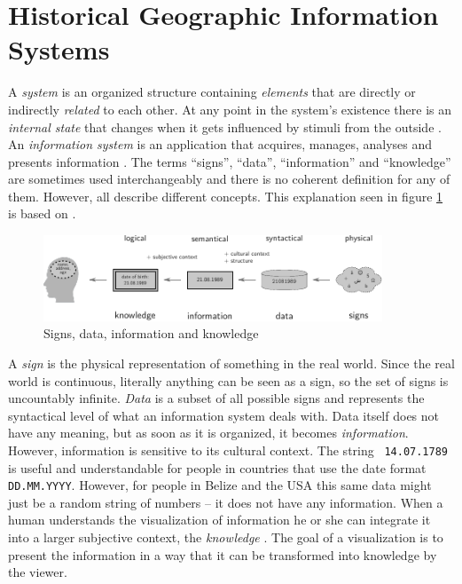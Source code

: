 

\section{Historical Geographic Information Systems} %
\label{sec:historical_geographic_information_systems}

A \emph{system} is an organized structure containing \emph{elements} that are directly or indirectly \emph{related} to each other. At any point in the system's existence there is an \emph{internal state} that changes when it gets influenced by stimuli from the outside \cite{buizdict}. An \emph{information system} is an application that acquires, manages, analyses and presents information \cite{informationSystem}. The terms ``signs'', ``data'', ``information'' and ``knowledge'' are sometimes used interchangeably and there is no coherent definition for any of them. However, all describe different concepts. This explanation seen in figure \ref{fig:information} is based on \cite{datinfwis}.

\begin{figure}[ht]
  \vspace{1em}
  \begin{center}
    \includegraphics[width=0.9\textwidth]{graphics/basics/hgis/information}
  \end{center}
  \caption{Signs, data, information and knowledge}
  \label{fig:information}
\end{figure}

A \emph{sign} is the physical representation of something in the real world. Since the real world is continuous, literally anything can be seen as a sign, so the set of signs is uncountably infinite.
\emph{Data} is a subset of all possible signs and represents the syntactical level of what an information system deals with. Data itself does not have any meaning, but as soon as it is organized, it becomes \emph{information}.
However, information is sensitive to its cultural context. The string ~\texttt{14.07.1789}~ is useful and understandable for people in countries that use the date format \texttt{DD.MM.YYYY}. However, for people in Belize and the USA this same data might just be a random string of numbers -- it does not have any information.
When a human understands the visualization of information he or she can integrate it into a larger subjective context, the \emph{knowledge} \cite{nake}.
The goal of a visualization is to present the information in a way that it can be transformed into knowledge by the viewer.


